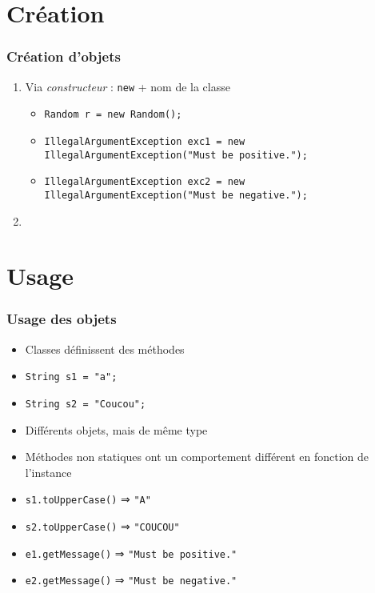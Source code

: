 \documentclass[english, french]{beamer}
\begin{document}
\section{Création}
\begin{frame}
	\frametitle{Création d’objets}
	\begin{enumerate}
		\item Via \emph{constructeur} : \texttt{new} + nom de la classe
		\begin{itemize}
			\item \texttt{Random r = new Random();}%
			\item \texttt{IllegalArgumentException exc1 = new IllegalArgumentException("Must be positive.");}
			\item \texttt{IllegalArgumentException exc2 = new IllegalArgumentException("Must be negative.");}
		\end{itemize}
		\item {}\onslide<2->{
			Via une méthode
			\begin{itemize}
				\item \texttt{Instant now = Instant.now();}%
				\item \texttt{String ten = String.valueOf(10);}
			\end{itemize}
			\item Via une variable statique: \texttt{DateTimeFormatter formatter = DateTimeFormatter.ISO\_DATE}
			\item Syntaxe particulière pour instances de \texttt{String} : \texttt{String s = "Coucou";}
		}
	\end{enumerate}
\end{frame}

\section{Usage}
\begin{frame}
	\frametitle{Usage des objets}
	\begin{itemize}
		\item Classes définissent des méthodes
		\item \texttt{String s1 = "a";}
		\item \texttt{String s2 = "Coucou";}
		\item Différents objets, mais de même type
		\item Méthodes non statiques ont un comportement différent en fonction de l’instance
		\item \texttt{s1.toUpperCase()} ⇒ \texttt{"A"}
		\item \texttt{s2.toUpperCase()} ⇒ \texttt{"COUCOU"}
		\item \texttt{e1.getMessage()} ⇒ \texttt{"Must be positive."}
		\item \texttt{e2.getMessage()} ⇒ \texttt{"Must be negative."}
	\end{itemize}
\end{frame}
\end{document}
